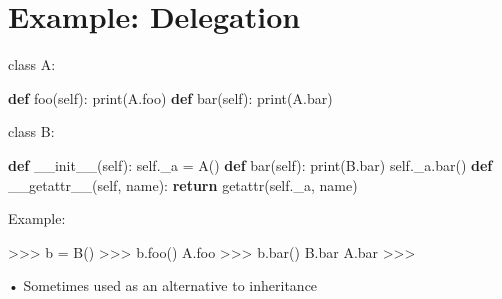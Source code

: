 \documentclass[
  letterpaper,
  DIV=11,
  numbers=noendperiod]{scrreprt}
\newenvironment{Shaded}{\begin{snugshade}}{\end{snugshade}}
\newcommand{\BuiltInTok}[1]{\textcolor[rgb]{0.00,0.23,0.31}{#1}}
\newcommand{\ControlFlowTok}[1]{\textcolor[rgb]{0.00,0.23,0.31}{\textbf{#1}}}
\newcommand{\FunctionTok}[1]{\textcolor[rgb]{0.28,0.35,0.67}{#1}}
\newcommand{\KeywordTok}[1]{\textcolor[rgb]{0.00,0.23,0.31}{\textbf{#1}}}
\newcommand{\NormalTok}[1]{\textcolor[rgb]{0.00,0.23,0.31}{#1}}
\newcommand{\OperatorTok}[1]{\textcolor[rgb]{0.37,0.37,0.37}{#1}}
\newcommand{\StringTok}[1]{\textcolor[rgb]{0.13,0.47,0.30}{#1}}
\newcommand{\VariableTok}[1]{\textcolor[rgb]{0.07,0.07,0.07}{#1}}
\begin{document}

\chapter{Example: Delegation}\label{example-delegation}

class A:

\begin{Shaded}
\begin{Highlighting}[]
\KeywordTok{def}\NormalTok{ foo(}\VariableTok{self}\NormalTok{):}
    \BuiltInTok{print}\NormalTok{(}\StringTok{\textquotesingle{}A.foo\textquotesingle{}}\NormalTok{)}
\KeywordTok{def}\NormalTok{ bar(}\VariableTok{self}\NormalTok{):}
    \BuiltInTok{print}\NormalTok{(}\StringTok{\textquotesingle{}A.bar\textquotesingle{}}\NormalTok{) }
\end{Highlighting}
\end{Shaded}

class B:

\begin{Shaded}
\begin{Highlighting}[]
\KeywordTok{def} \FunctionTok{\_\_init\_\_}\NormalTok{(}\VariableTok{self}\NormalTok{):}
    \VariableTok{self}\NormalTok{.\_a }\OperatorTok{=}\NormalTok{ A()}
\KeywordTok{def}\NormalTok{ bar(}\VariableTok{self}\NormalTok{):}
    \BuiltInTok{print}\NormalTok{(}\StringTok{\textquotesingle{}B.bar\textquotesingle{}}\NormalTok{)}
    \VariableTok{self}\NormalTok{.\_a.bar()}
\KeywordTok{def} \FunctionTok{\_\_getattr\_\_}\NormalTok{(}\VariableTok{self}\NormalTok{, name):}
    \ControlFlowTok{return} \BuiltInTok{getattr}\NormalTok{(}\VariableTok{self}\NormalTok{.\_a, name) }
\end{Highlighting}
\end{Shaded}

Example:

\begin{Shaded}
\begin{Highlighting}[]
\NormalTok{\textgreater{}\textgreater{}\textgreater{} b = B()  }
\NormalTok{\textgreater{}\textgreater{}\textgreater{} b.foo()  }
\NormalTok{A.foo  }
\NormalTok{\textgreater{}\textgreater{}\textgreater{} b.bar()  }
\NormalTok{B.bar  }
\NormalTok{A.bar  }
\NormalTok{\textgreater{}\textgreater{}\textgreater{} }
\end{Highlighting}
\end{Shaded}

• Sometimes used as an alternative to inheritance
\end{document}
